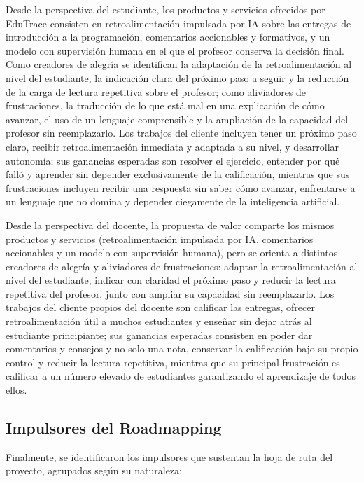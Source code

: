 \documentclass[letterpaper, 10 pt, conference]{ieeeconf}
\begin{document}
Desde la perspectiva del estudiante, los productos y servicios ofrecidos por EduTrace consisten en retroalimentación impulsada por IA sobre las entregas de introducción a la programación, comentarios accionables y formativos, y un modelo con supervisión humana en el que el profesor conserva la decisión final. Como creadores de alegría se identifican la adaptación de la retroalimentación al nivel del estudiante, la indicación clara del próximo paso a seguir y la reducción de la carga de lectura repetitiva sobre el profesor; como aliviadores de frustraciones, la traducción de lo que está mal en una explicación de cómo avanzar, el uso de un lenguaje comprensible y la ampliación de la capacidad del profesor sin reemplazarlo. Los trabajos del cliente incluyen tener un próximo paso claro, recibir retroalimentación inmediata y adaptada a su nivel, y desarrollar autonomía; sus ganancias esperadas son resolver el ejercicio, entender por qué falló y aprender sin depender exclusivamente de la calificación, mientras que sus frustraciones incluyen recibir una respuesta sin saber cómo avanzar, enfrentarse a un lenguaje que no domina y depender ciegamente de la inteligencia artificial.

Desde la perspectiva del docente, la propuesta de valor comparte los mismos productos y servicios (retroalimentación impulsada por IA, comentarios accionables y un modelo con supervisión humana), pero se orienta a distintos creadores de alegría y aliviadores de frustraciones: adaptar la retroalimentación al nivel del estudiante, indicar con claridad el próximo paso y reducir la lectura repetitiva del profesor, junto con ampliar su capacidad sin reemplazarlo. Los trabajos del cliente propios del docente son calificar las entregas, ofrecer retroalimentación útil a muchos estudiantes y enseñar sin dejar atrás al estudiante principiante; sus ganancias esperadas consisten en poder dar comentarios y consejos y no solo una nota, conservar la calificación bajo su propio control y reducir la lectura repetitiva, mientras que su principal frustración es calificar a un número elevado de estudiantes garantizando el aprendizaje de todos ellos.

\subsection{Impulsores del Roadmapping}
Finalmente, se identificaron los impulsores que sustentan la hoja de ruta del proyecto, agrupados según su naturaleza:
\end{document}
